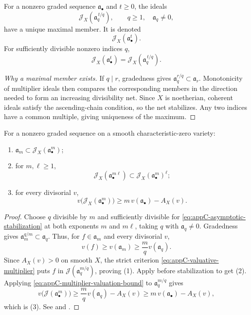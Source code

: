 \begin{definition}
\label{def:appC-asymptotic-multiplier}
For a nonzero graded sequence \(\mathfrak a_\bullet\) and \(t\geq0\), the ideals
\[
 \mathcal J_X\left(\mathfrak a_q^{\,t/q}\right),
\qquad q\geq1,\quad \mathfrak a_q\ne0,
\]
have a unique maximal member.  It is denoted
\[
 \mathcal J_X(\mathfrak a_\bullet^t).
\tag{C.15}\label{eq:appC-asymptotic-multiplier}
\]
For sufficiently divisible nonzero indices \(q\),
\[
 \mathcal J_X(\mathfrak a_\bullet^t)
 =\mathcal J_X(\mathfrak a_q^{\,t/q}).
\tag{C.16}\label{eq:appC-asymptotic-stabilization}
\]
\end{definition}

\begin{proof}[Why a maximal member exists]
If \(q\mid r\), gradedness gives
\(\mathfrak a_q^{r/q}\subset\mathfrak a_r\).  Monotonicity of multiplier
ideals then compares the corresponding members in the direction needed to
form an increasing divisibility net.  Since \(X\) is noetherian, coherent
ideals satisfy the ascending-chain condition, so the net stabilizes.  Any
two indices have a common multiple, giving uniqueness of the maximum.
\end{proof}

\begin{proposition}\label{prop:appC-asymptotic-multiplier-properties}
For a nonzero graded sequence on a smooth characteristic-zero variety:
\begin{enumerate}
\item \(\mathfrak a_m\subset
      \mathcal J_X(\mathfrak a_\bullet^m)\);
\item for \(m,\ell\geq1\),
\[
 \mathcal J_X(\mathfrak a_\bullet^{m\ell})
 \subset
 \mathcal J_X(\mathfrak a_\bullet^m)^\ell;
\tag{C.17}\label{eq:appC-asymptotic-subadditivity}
\]
\item for every divisorial \(v\),
\[
 v\bigl(\mathcal J_X(\mathfrak a_\bullet^m)\bigr)
 \geq m\,v(\mathfrak a_\bullet)-A_X(v).
\tag{C.18}\label{eq:appC-asymptotic-discrepancy}
\]
\end{enumerate}
\par
\end{proposition}

\begin{proof}
Choose \(q\) divisible by \(m\) and sufficiently divisible for
\eqref{eq:appC-asymptotic-stabilization} at both exponents \(m\) and
\(m\ell\), taking \(q\) with \(\mathfrak a_q\ne0\).  Gradedness gives
\(\mathfrak a_m^{q/m}\subset\mathfrak a_q\).  Thus, for
\(f\in\mathfrak a_m\) and every divisorial \(v\),
\[
 v(f)\geq v(\mathfrak a_m)
       \geq\frac mqv(\mathfrak a_q).
\]
Since \(A_X(v)>0\) on smooth \(X\), the strict criterion
\eqref{eq:appC-valuative-multiplier} puts \(f\) in
\(\mathcal J(\mathfrak a_q^{m/q})\), proving (1).  Apply
 before stabilization to get
(2).  Applying \eqref{eq:appC-multiplier-valuation-bound} to
\(\mathfrak a_q^{m/q}\) gives
\[
 v\bigl(\mathcal J(\mathfrak a_\bullet^m)\bigr)
 \geq\frac mqv(\mathfrak a_q)-A_X(v)
 \geq m\,v(\mathfrak a_\bullet)-A_X(v),
\]
which is (3).  See \cite[Chapter~11]{PAG2} and \cite{JM12}.
\end{proof}

